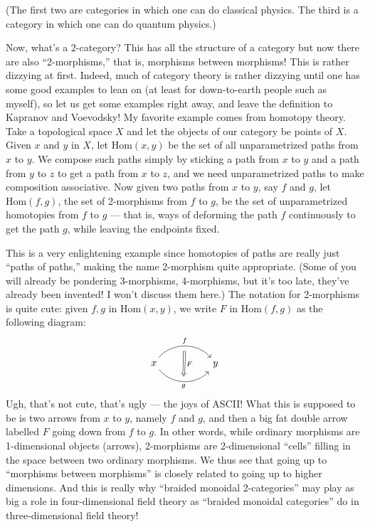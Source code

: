 \documentclass{article}
\begin{document}
(The first two are categories in which one can do classical physics. The
third is a category in which one can do quantum physics.)

Now, what's a 2-category? This has all the structure of a category but
now there are also ``2-morphisms,'' that is, morphisms between
morphisms! This is rather dizzying at first. Indeed, much of category
theory is rather dizzying until one has some good examples to lean on
(at least for down-to-earth people such as myself), so let us get some
examples right away, and leave the definition to Kapranov and Voevodsky!
My favorite example comes from homotopy theory. Take a topological space
\(X\) and let the objects of our category be points of \(X\). Given
\(x\) and \(y\) in \(X\), let \(\mathrm{Hom}(x,y)\) be the set of all
unparametrized paths from \(x\) to \(y\). We compose such paths simply
by sticking a path from \(x\) to \(y\) and a path from \(y\) to \(z\) to
get a path from \(x\) to \(z\), and we need unparametrized paths to make
composition associative. Now given two paths from \(x\) to \(y\), say
\(f\) and \(g\), let \(\mathrm{Hom}(f,g)\), the set of 2-morphisms from
\(f\) to \(g\), be the set of unparametrized homotopies from \(f\) to
\(g\) --- that is, ways of deforming the path \(f\) continuously to get
the path \(g\), while leaving the endpoints fixed.

This is a very enlightening example since homotopies of paths are really
just ``paths of paths,'' making the name 2-morphism quite appropriate.
(Some of you will already be pondering 3-morphisms, 4-morphisms, but
it's too late, they've already been invented! I won't discuss them
here.) The notation for 2-morphisms is quite cute: given \(f,g\) in
\(\mathrm{Hom}(x,y)\), we write \(F\) in \(\mathrm{Hom}(f,g)\) as the
following diagram: \[
  \begin{tikzcd}[sep=huge]
    x
      \rar[bend left=50,"f"{name=U}]
      \rar[bend right=50,swap,"g"{name=D}]
    & y
      \arrow[Rightarrow,shorten=5pt,from=U,to=D,"F"]
  \end{tikzcd}
\] Ugh, that's not cute, that's ugly --- the joys of ASCII! What this is
supposed to be is two arrows from \(x\) to \(y\), namely \(f\) and
\(g\), and then a big fat double arrow labelled \(F\) going down from
\(f\) to \(g\). In other words, while ordinary morphisms are
1-dimensional objects (arrows), 2-morphisms are 2-dimensional ``cells''
filling in the space between two ordinary morphisms. We thus see that
going up to ``morphisms between morphisms'' is closely related to going
up to higher dimensions. And this is really why ``braided monoidal
2-categories'' may play as big a role in four-dimensional field theory
as ``braided monoidal categories'' do in three-dimensional field theory!
\end{document}
